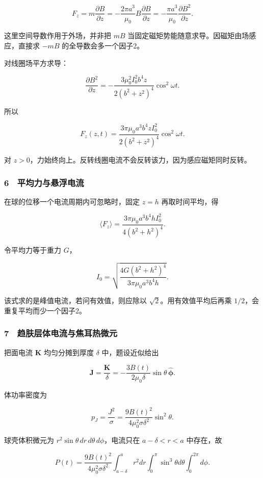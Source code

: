 \documentclass[12pt,a4paper,fontset=fandol]{ctexart}
\begin{document}
\[F_z=m\frac{\partial B}{\partial z}
=-\frac{2\pi a^3}{\mu_0}B\frac{\partial B}{\partial z}
=-\frac{\pi a^3}{\mu_0}\frac{\partial B^2}{\partial z}.\]

这里空间导数作用于外场，并非把 \(mB\)
当固定磁矩势能随意求导。因磁矩由场感应，直接求 \(-mB\)
的全导数会多一个因子2。

对线圈场平方求导：

\[\frac{\partial B^2}{\partial z}
=-\frac{3\mu_0^2I_0^2b^4z}{2(b^2+z^2)^4}
\cos^2\omega t.\]

所以

\[\boxed{F_z(z,t)=
\frac{3\pi\mu_0a^3b^4zI_0^2}{2(b^2+z^2)^4}
\cos^2\omega t.}\]

对 \(z>0\)，力始终向上。反转线圈电流不会反转该力，因为感应磁矩同时反转。

\subsubsection{6　平均力与悬浮电流}\label{ux5e73ux5747ux529bux4e0eux60acux6d6eux7535ux6d41}

在球的位移一个电流周期内可忽略时，固定 \(z=h\) 再取时间平均，得

\[\boxed{\langle F_z\rangle=
\frac{3\pi\mu_0a^3b^4hI_0^2}{4(b^2+h^2)^4}.}\]

令平均力等于重力 \(G\)，

\[\boxed{I_0=\sqrt{
\frac{4G(b^2+h^2)^4}{3\pi\mu_0a^3b^4h}}.}\]

该式求的是峰值电流，若问有效值，则应除以 \(\sqrt2\)。用有效值平均后再乘
\(1/2\)，会重复平均而少一个因子2。

\subsubsection{7　趋肤层体电流与焦耳热微元}\label{ux8d8bux80a4ux5c42ux4f53ux7535ux6d41ux4e0eux7126ux8033ux70edux5faeux5143}

把面电流 \(\boldsymbol K\) 均匀分摊到厚度 \(\delta\) 中，题设近似给出

\[\boldsymbol J=\frac{\boldsymbol K}{\delta}
=-\frac{3B(t)}{2\mu_0\delta}\sin\theta\,
\hat{\boldsymbol\phi}.\]

体功率密度为

\[p_J=\frac{J^2}{\sigma}
=\frac{9B(t)^2}{4\mu_0^2\sigma\delta^2}\sin^2\theta.\]

球壳体积微元为 \(r^2\sin\theta\,dr\,d\theta\,d\phi\)，电流只在
\(a-\delta<r<a\) 中存在，故

\[P(t)=\frac{9B(t)^2}{4\mu_0^2\sigma\delta^2}
\int_{a-\delta}^a r^2dr
\int_0^\pi\sin^3\theta d\theta
\int_0^{2\pi}d\phi.\]
\end{document}
